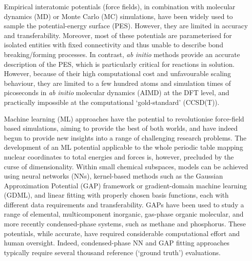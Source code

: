 \documentclass[../../main.tex]{subfiles}
\begin{document}
Empirical interatomic potentials (force fields), in combination with molecular dynamics (MD) or Monte Carlo (MC) simulations, have been widely used to sample the potential-energy surface (PES). However, they are limited in accuracy and transferability.\cite{Lindorff-Larsen2012} Moreover, most of these potentials are parameterised for isolated entities with fixed connectivity and thus unable to describe bond breaking/forming processes. In contrast, \emph{ab initio} methods provide an accurate description of the PES, which is particularly critical for reactions in solution. However, because of their high computational cost and unfavourable scaling behaviour, they are limited to a few hundred atoms and simulation times of picoseconds in \emph{ab initio} molecular dynamics (AIMD) at the DFT level, and practically impossible at the computational ‘gold-standard’ (CCSD(T)).\cite{Iftimie2005} 

Machine learning (ML) approaches have the potential to revolutionise force-field based simulations, aiming to provide the best of both worlds,\cite{Noe2020, Mueller2020, Unke2020} and have indeed begun to provide new insights into a range of challenging research problems.\cite{Khaliullin2011, Sosso2013, Niu2020, Cheng2020nature, Deringer2021, Ang2021, Cole2020, Rufa2020, Gastegger2017, Li2021} The development of an ML potential applicable to the whole periodic table mapping nuclear coordinates to total energies and forces is, however, precluded by the curse of dimensionality. Within small chemical subspaces, models can be achieved using neural networks (NNs),\cite{Unke2020, Behler2007, Behler2017, Smith2017, Schutt2017, Unke2019} kernel-based methods such as the Gaussian Approximation Potential (GAP) framework\cite{Bartok2010, Bartok2015} or gradient-domain machine learning (GDML),\cite{Chmiela2017} and linear fitting with properly chosen basis functions,\cite{Thompson2015, Shapeev2016} each with different data requirements and transferability.\cite{Zuo2020} GAPs have been used to study a range of elemental,\cite{Szlachta2014, Deringer2017, Bartok2018} multicomponent inorganic,\cite{Sivaraman2020, Mocanu2018} gas-phase organic molecular,\cite{Cole2020, Dral2020} and more recently condensed-phase systems, such as methane\cite{Veit2019} and phosphorus.\cite{Deringer2020} These potentials, while accurate, have required considerable computational effort and human oversight. Indeed, condensed-phase NN\cite{Cheng2019, Schran2020} and GAP fitting approaches typically require several thousand reference (`ground truth') evaluations.
\end{document}

